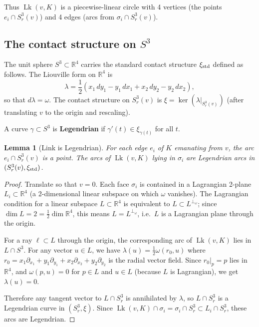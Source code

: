 \documentclass[12pt]{article}
\DeclareMathOperator{\Lk}{Lk}
\newtheorem{lemma}[theorem]{Lemma}
\newcommand{\bR}{\mathbb{R}}
\newcommand{\om}{\omega}
\newcommand{\la}{\lambda}
\newcommand{\dd}{\partial}
\begin{document}
Thus $\Lk(v, K)$ is a piecewise-linear circle with 4 vertices (the points $e_i \cap S^3_r(v)$) and 4 edges (arcs from $\sigma_i \cap S^3_r(v)$).

\subsection{The contact structure on $S^3$}

The unit sphere $S^3 \subset \bR^4$ carries the standard contact structure $\xi_{\rm std}$ defined as follows. The Liouville form on $\bR^4$ is
\[
  \la = \frac{1}{2}(x_1 \,dy_1 - y_1\, dx_1 + x_2 \,dy_2 - y_2 \,dx_2),
\]
so that $d\la = \om$. The contact structure on $S^3_r(v)$ is $\xi = \ker(\la|_{S^3_r(v)})$ (after translating $v$ to the origin and rescaling).

A curve $\gamma \subset S^3$ is \textbf{Legendrian} if $\gamma'(t) \in \xi_{\gamma(t)}$ for all $t$.

\begin{lemma}[Link is Legendrian]
\label{lem:legendrian-link}
For each edge $e_i$ of $K$ emanating from $v$, the arc $e_i \cap S^3_r(v)$ is a point. The arcs of $\Lk(v,K)$ lying in $\sigma_i$ are Legendrian arcs in $(S^3_r(v), \xi_{\rm std})$.
\end{lemma}

\begin{proof}
Translate so that $v = 0$. Each face $\sigma_i$ is contained in a Lagrangian 2-plane $L_i \subset \bR^4$ (a 2-dimensional linear subspace on which $\om$ vanishes). The Lagrangian condition for a linear subspace $L \subset \bR^4$ is equivalent to $L \subset L^{\perp_\om}$; since $\dim L = 2 = \frac{1}{2}\dim \bR^4$, this means $L = L^{\perp_\om}$, i.e.\ $L$ is a Lagrangian plane through the origin.

For a ray $\ell \subset L$ through the origin, the corresponding arc of $\Lk(v,K)$ lies in $L \cap S^3$. For any vector $u \in L$, we have $\la(u) = \frac{1}{2}\om(r_0, u)$ where $r_0 = x_1\dd_{x_1} + y_1\dd_{y_1} + x_2\dd_{x_2} + y_2\dd_{y_2}$ is the radial vector field. Since $r_0|_p = p$ lies in $\bR^4$, and $\om(p, u) = 0$ for $p \in L$ and $u \in L$ (because $L$ is Lagrangian), we get $\la(u) = 0$.

Therefore any tangent vector to $L \cap S^3_r$ is annihilated by $\la$, so $L \cap S^3_r$ is a Legendrian curve in $(S^3_r, \xi)$. Since $\Lk(v,K) \cap \sigma_i = \sigma_i \cap S^3_r \subset L_i \cap S^3_r$, these arcs are Legendrian.
\end{proof}
\end{document}
